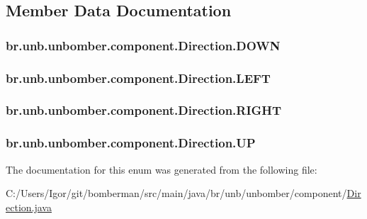 \subsection{Member Data Documentation}
\hypertarget{enumbr_1_1unb_1_1unbomber_1_1component_1_1_direction_a4aff2b688038d287c0c4a68f5c408b5c}{
\subsubsection[{D\+O\+W\+N}]{\setlength{\rightskip}{0pt plus 5cm}br.\+unb.\+unbomber.\+component.\+Direction.\+D\+O\+W\+N}}\label{enumbr_1_1unb_1_1unbomber_1_1component_1_1_direction_a4aff2b688038d287c0c4a68f5c408b5c}
\hypertarget{enumbr_1_1unb_1_1unbomber_1_1component_1_1_direction_a13dd31c7fec75b184bc1db7bcbc41318}{
\subsubsection[{L\+E\+F\+T}]{\setlength{\rightskip}{0pt plus 5cm}br.\+unb.\+unbomber.\+component.\+Direction.\+L\+E\+F\+T}}\label{enumbr_1_1unb_1_1unbomber_1_1component_1_1_direction_a13dd31c7fec75b184bc1db7bcbc41318}
\hypertarget{enumbr_1_1unb_1_1unbomber_1_1component_1_1_direction_a986303841d09432802c74e2ee7966491}{
\subsubsection[{R\+I\+G\+H\+T}]{\setlength{\rightskip}{0pt plus 5cm}br.\+unb.\+unbomber.\+component.\+Direction.\+R\+I\+G\+H\+T}}\label{enumbr_1_1unb_1_1unbomber_1_1component_1_1_direction_a986303841d09432802c74e2ee7966491}
\hypertarget{enumbr_1_1unb_1_1unbomber_1_1component_1_1_direction_ad6284477e0be6b560ab3f4a2b5fe677a}{
\subsubsection[{U\+P}]{\setlength{\rightskip}{0pt plus 5cm}br.\+unb.\+unbomber.\+component.\+Direction.\+U\+P}}\label{enumbr_1_1unb_1_1unbomber_1_1component_1_1_direction_ad6284477e0be6b560ab3f4a2b5fe677a}


The documentation for this enum was generated from the following file\+:\begin{DoxyCompactItemize}
\item 
C\+:/\+Users/\+Igor/git/bomberman/src/main/java/br/unb/unbomber/component/\hyperlink{_direction_8java}{Direction.\+java}\end{DoxyCompactItemize}
